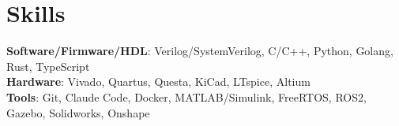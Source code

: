 \documentclass[letterpaper,11pt]{article}
\begin{document}
%
\section{Skills}
 \begin{itemize}[leftmargin=0.15in, label={}]
    \small{\item{
     \textbf{Software/Firmware/HDL}{: Verilog/SystemVerilog, C/C++, Python, Golang, Rust, TypeScript } \\
     \textbf{Hardware}{: Vivado, Quartus, Questa, KiCad, LTspice, Altium} \\
     \textbf{Tools}{: Git, Claude Code, Docker, MATLAB/Simulink, FreeRTOS, ROS2, Gazebo, Solidworks, Onshape} \\
    }}
 \end{itemize}


\end{document}
